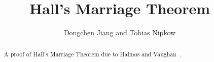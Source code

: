 \documentclass[11pt,a4paper]{article}
\begin{document}
\title{Hall's Marriage Theorem}
\author{Dongchen Jiang and Tobias Nipkow}
\maketitle

\begin{abstract}
  A proof of Hall's Marriage Theorem due to Halmos and Vaughan~\cite{HalmosV}.
\end{abstract}





\end{document}
